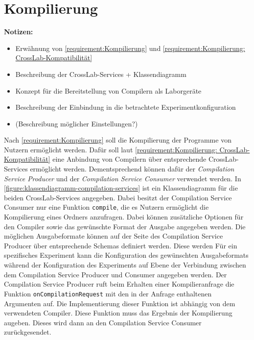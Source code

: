 \section{Kompilierung}\label{section:konzeption:kompilierung}

\begin{note}
    \textbf{Notizen:}
    \begin{itemize}
        \item Erwähnung von \autoref{requirement:Kompilierung} und \autoref{requirement:Kompilierung: CrossLab-Kompatibilität}
        \item Beschreibung der CrossLab-Services + Klassendiagramm
        \item Konzept für die Bereitstellung von Compilern als Laborgeräte
        \item Beschreibung der Einbindung in die betrachtete Experimentkonfiguration
        \item (Beschreibung möglicher Einstellungen?)
    \end{itemize}
\end{note}

Nach \autoref{requirement:Kompilierung} soll die Kompilierung der Programme von Nutzern ermöglicht werden. Dafür soll laut \autoref{requirement:Kompilierung: CrossLab-Kompatibilität} eine Anbindung von Compilern über entsprechende CrossLab-Services ermöglicht werden. Dementsprechend können dafür der \textit{Compilation Service Producer} und der \textit{Compilation Service Consumer} verwendet werden. In \autoref{figure:klassendiagramm-compilation-services} ist ein Klassendiagramm für die beiden CrossLab-Services angegeben. Dabei besitzt der Compilation Service Consumer nur eine Funktion \texttt{compile}, die es Nutzern ermöglicht die Kompilierung eines Ordners anzufragen. Dabei können zusätzliche Optionen für den Compiler sowie das gewünschte Format der Ausgabe angegeben werden. Die möglichen Ausgabeformate können auf der Seite des Compilation Service Producer über entsprechende Schemas definiert werden. Diese werden  Für ein spezifisches Experiment kann die Konfiguration des gewünschten Ausgabeformats während der Konfiguration des Experiments auf Ebene der Verbindung zwischen dem Compilation Service Producer und Consumer angegeben werden. Der Compilation Service Producer ruft beim Erhalten einer Kompilieranfrage die Funktion \texttt{onCompilationRequest} mit den in der Anfrage enthaltenen Argumenten auf. Die Implementierung dieser Funktion ist abhängig von dem verwendeten Compiler. Diese Funktion muss das Ergebnis der Kompilierung augeben. Dieses wird dann an den Compilation Service Consumer zurückgesendet.

